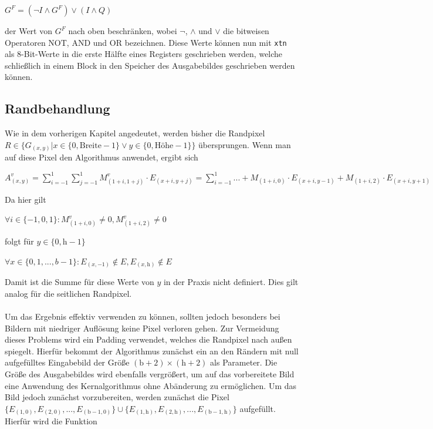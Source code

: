\documentclass[course=asp]{aspdoc}
\begin{document}
\begin{center}
$G^F = (\neg I \wedge G^F)\vee(I \wedge Q)$
\end{center}
der Wert von $G^F$ nach oben beschränken, wobei $\neg$, $\wedge$ und $\vee$ die bitweisen Operatoren NOT, AND und OR bezeichnen. Diese Werte können nun mit \texttt{xtn}~\cite{arm2017man} als 8-Bit-Werte in die erste Hälfte eines Registers geschrieben werden, welche schließlich in einem Block in den Speicher des Ausgabebildes geschrieben werden können.
\subsection{Randbehandlung} \label{Randbehandlung}
Wie in dem vorherigen Kapitel angedeutet, werden bisher die Randpixel  $R \in \{G_{(x,y)} | x \in \{0, \text{Breite} - 1\} \vee y \in \{0, \text{Höhe}-1\}\}$ übersprungen. Wenn man auf diese Pixel den Algorithmus anwendet, ergibt sich
\begin{center}
$A_{(x,y)}^v=\displaystyle\sum_{i=-1}^{1}\displaystyle\sum_{j=-1}^{1}M_{(1+i,1+j)}^{v}\cdot E_{(x+i,y+j)}=\displaystyle\sum_{i=-1}^{1}...+M_{(1+i,0)} \cdot E_{(x+i,y-1)}+M_{(1+i,2)} \cdot E_{(x+i,y+1)}$
\end{center}
Da hier gilt
\begin{center}
$\forall i \in \{-1, 0,1\}:M_{(1+i,0)}^v \neq 0, M_{(1+i,2)}^v \neq 0$
\end{center}
folgt für $y \in \{0, \text{h}-1\}$
\begin{center}
$\forall x \in \{0, 1, ..., b-1\}:E_{(x,-1)} \notin E, E_{(x,\text{h})} \notin E$
\end{center}
Damit ist die Summe für diese Werte von $y$ in der Praxis nicht definiert. Dies gilt analog für die seitlichen Randpixel.\\\\
Um das Ergebnis effektiv verwenden zu können, sollten jedoch besonders bei Bildern mit niedriger Auflösung keine Pixel verloren gehen. Zur Vermeidung dieses Problems wird ein Padding verwendet, welches die Randpixel nach außen spiegelt. Hierfür bekommt der Algorithmus zunächst ein an den Rändern mit null aufgefülltes Eingabebild der Größe $( \text{b} + 2)\times ( \text{h} + 2)$ als Parameter. Die Größe des Ausgabebildes wird ebenfalls vergrößert, um auf das vorbereitete Bild eine Anwendung des Kernalgorithmus ohne Abänderung zu ermöglichen. Um das Bild jedoch zunächst vorzubereiten, werden zunächst die Pixel $\{E_{(1,0)}, E_{(2,0)}, ..., E_{( \text{b} -1,0)}\} \cup \{E_{(1, \text{h})}, E_{(2, \text{h})}, ..., E_{( \text{b} -1, \text{h})}\}$ aufgefüllt. Hierfür wird die Funktion 
\end{document}
